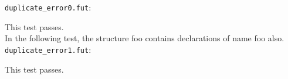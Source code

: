 \texttt{duplicate_error0.fut}:

This test passes.
\\
In the following test, the structure foo contains declarations of name foo also.
\texttt{duplicate_error1.fut}:

This test passes.
